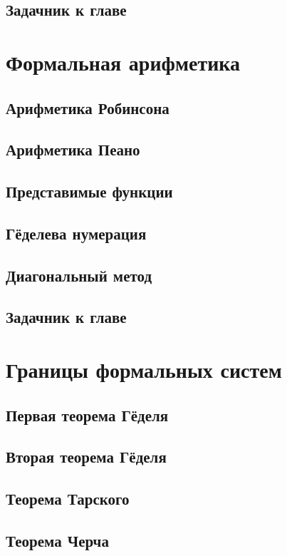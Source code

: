 \documentclass[12pt,a4paper,oneside,openany]{book}
\theoremstyle{definition}
\theoremstyle{plain}
\theoremstyle{remark}
\begin{document}
\section{Задачник к главе}

\chapter{Формальная арифметика}

\section{Арифметика Робинсона}
\section{Арифметика Пеано}
\section{Представимые функции}
\section{Гёделева нумерация}
\section{Диагональный метод}

\section{Задачник к главе}

\chapter{Границы формальных систем}

\section{Первая теорема Гёделя}
\section{Вторая теорема Гёделя}
\section{Теорема Тарского}
\section{Теорема Черча}
\end{document}
